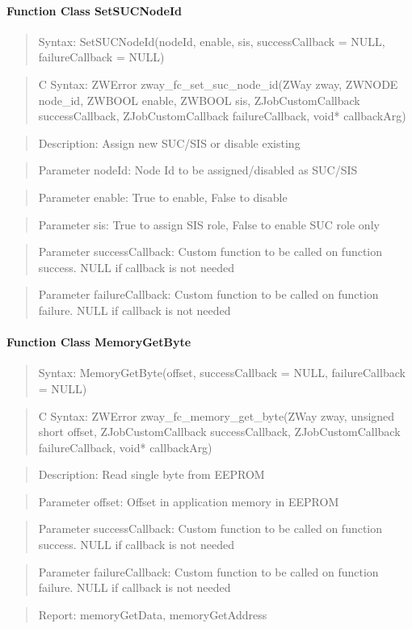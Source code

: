 \paragraph{Function Class SetSUCNodeId}
\begin{quote}Syntax: SetSUCNodeId(nodeId, enable, sis, successCallback = NULL, failureCallback = NULL)\end{quote}
\begin{quote}C Syntax: ZWError zway\_fc\_set\_suc\_node\_id(ZWay zway, ZWNODE node\_id, ZWBOOL enable, ZWBOOL sis, ZJobCustomCallback successCallback, ZJobCustomCallback failureCallback, void* callbackArg)\end{quote}
\begin{quote}Description: Assign new SUC/SIS or disable existing\end{quote}
\begin{quote}Parameter nodeId: Node Id to be assigned/disabled as SUC/SIS\end{quote}
\begin{quote}Parameter enable: True to enable, False to disable\end{quote}
\begin{quote}Parameter sis: True to assign SIS role, False to enable SUC role only\end{quote}
\begin{quote}Parameter successCallback: Custom function to be called on function success. NULL if callback is not needed\end{quote}
\begin{quote}Parameter failureCallback: Custom function to be called on function failure. NULL if callback is not needed\end{quote}


\paragraph{Function Class MemoryGetByte}
\begin{quote}Syntax: MemoryGetByte(offset, successCallback = NULL, failureCallback = NULL)\end{quote}
\begin{quote}C Syntax: ZWError zway\_fc\_memory\_get\_byte(ZWay zway, unsigned short offset, ZJobCustomCallback successCallback, ZJobCustomCallback failureCallback, void* callbackArg)\end{quote}
\begin{quote}Description: Read single byte from EEPROM\end{quote}
\begin{quote}Parameter offset: Offset in application memory in EEPROM\end{quote}
\begin{quote}Parameter successCallback: Custom function to be called on function success. NULL if callback is not needed\end{quote}
\begin{quote}Parameter failureCallback: Custom function to be called on function failure. NULL if callback is not needed\end{quote}
\begin{quote}Report: memoryGetData, memoryGetAddress\end{quote}

